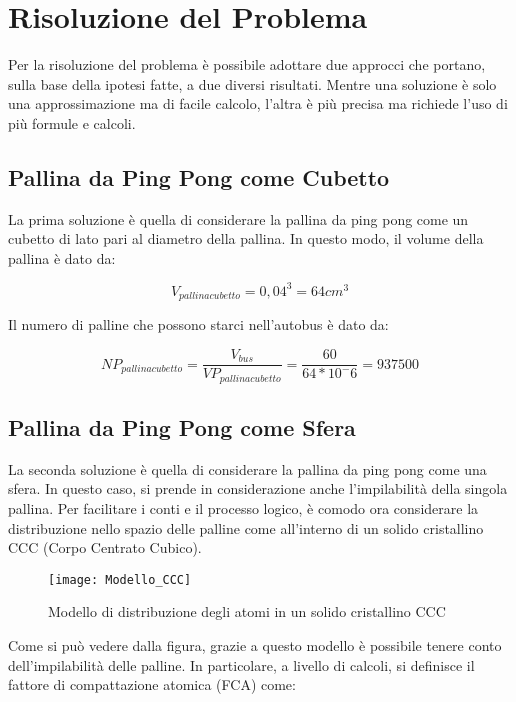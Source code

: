 
\section{Risoluzione del Problema}
Per la risoluzione del problema è possibile adottare due approcci che portano, sulla base della ipotesi fatte, a due diversi risultati.
Mentre una soluzione è solo una approssimazione ma di facile calcolo, l'altra è più precisa ma richiede l'uso di più formule e calcoli.

\subsection{Pallina da Ping Pong come Cubetto}
La prima soluzione è quella di considerare la pallina da ping pong come un cubetto di lato pari al diametro della pallina.
In questo modo, il volume della pallina è dato da:

\begin{equation}
    V_{pallinacubetto} = 0,04^3 = 64 cm^3
\end{equation}

Il numero di palline che possono starci nell'autobus è dato da:

\begin{equation}
    NP_{pallinacubetto} = \frac{V_{bus}}{VP_{pallinacubetto}} = \frac{60}{64*10^-6} = 937500
\end{equation}


\subsection{Pallina da Ping Pong come Sfera}
La seconda soluzione è quella di considerare la pallina da ping pong come una sfera.
In questo caso, si prende in considerazione anche l'impilabilità della singola pallina.
Per facilitare i conti e il processo logico, è comodo ora considerare la distribuzione nello spazio delle palline come all'interno di un solido cristallino CCC (Corpo Centrato Cubico).

\begin{figure}[H]
    \centering
    \texttt{[image: Modello\_CCC]}
    \caption{Modello di distribuzione degli atomi in un solido cristallino CCC}
\end{figure}

Come si può vedere dalla figura, grazie a questo modello è possibile tenere conto dell'impilabilità delle palline.
In particolare, a livello di calcoli, si definisce il fattore di compattazione atomica (FCA) come:

